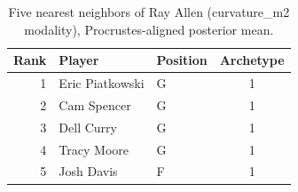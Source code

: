 \begin{table}[htbp]
  \centering\small
  \begin{tabular}{rllc}
    \toprule
    Rank & Player & Position & Archetype \\
    \midrule
    1 & Eric Piatkowski & G & 1 \\
    2 & Cam Spencer & G & 1 \\
    3 & Dell Curry & G & 1 \\
    4 & Tracy Moore & G & 1 \\
    5 & Josh Davis & F & 1 \\
    \bottomrule
  \end{tabular}
  \caption{Five nearest neighbors of Ray Allen (curvature_m2 modality), Procrustes-aligned posterior mean.}
  \label{tab:Ray_Allen_neighbors_curvature_m2}
\end{table}

